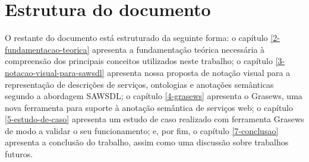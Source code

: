 \section{Estrutura do documento}\label{1-introducao-estrutura-documento} 

O restante do documento está estruturado da seguinte forma: o capítulo \ref{2-fundamentacao-teorica} apresenta a fundamentação teórica necessária à compreensão dos principais conceitos utilizados neste trabalho; o capítulo \ref{3-notacao-visual-para-sawsdl} apresenta nossa proposta de notação visual para a representação de descrições de serviços, ontologias e anotações semânticas segundo a abordagem SAWSDL; o capítulo \ref{4-grasews} apresenta o Grasews, uma nova ferramenta para suporte à anotação semântica de serviços web; o capítulo \ref{5-estudo-de-caso} apresenta um estudo de caso realizado com ferramenta Grasews de modo a validar o seu funcionamento; e, por fim, o capítulo \ref{7-conclusao} apresenta a conclusão do trabalho, assim como uma discussão sobre trabalhos futuros.

